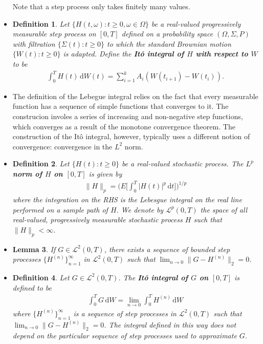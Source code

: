 \documentclass[10pt]{article}
\newtheorem{lemma}{Lemma}
\newtheorem{definition}[lemma]{Definition}
\newcommand{\dee}{\mathrm{d}}
\newcommand{\mcal}[1]{\mathcal{#1}}
\begin{document}
\begin{itemize}
  Note that a step process only takes finitely many values.

  \item \begin{definition}
    Let $\{H(t,\omega): t \geq 0, \omega \in \Omega\}$ be a real-valued progressively measurable step process on $[0,T]$ defined on a probability space $(\Omega,\Sigma,P)$ with filtration $\{ \Sigma(t): t \geq 0 \}$ to which the standard Brownian motion $\{W(t) : t \geq 0\}$ is adapted. Define the {\bf It\^{o} integral of $H$ with respect to $W$} to be
    \begin{align*}
      \int_0^T H(t)\, \dee W(t) = \sum_{i=1}^k A_i ( W(t_{i+1}) - W(t_{i})).
    \end{align*}    
  \end{definition}

  \item The definition of the Lebegue integral relies on the fact that every measurable function has a sequence of simple functions that converges to it. The construcion involes a series of increasing and non-negative step functions, which converges as a result of the monotone convergence theorem. The construction of the It\^{o} integral, however, typically uses a different notion of convergence: convergence in the $L^2$ norm.
  
  \item \begin{definition}
    Let $\{H(t) : t \geq 0\}$ be a real-valued stochastic process. The {\bf $L^p$ norm of $H$ on $[0,T]$} is given by
    \begin{align*}
      \| H \|_p = \bigg( E \bigg[ \int_0^T |H(t)|^p\, \dee t \bigg] \bigg)^{1/p}
    \end{align*}
    where the integration on the RHS is the Lebesgue integral on the real line performed on a sample path of $H$. We denote by $\mcal{L}^p(0,T)$ the space of all real-valued, progressively measurable stochastic process $H$ such that $\| H \|_p < \infty$.    
  \end{definition}

  \item \begin{lemma}
    If $G \in \mcal{L}^2(0,T)$, there exists a sequence of bounded step processes $\{H^{(n)} \}_{n=1}^\infty$ in $\mcal{L}^2(0,T)$ such that
    $\lim_{n \rightarrow 0} \| G - H^{(n)} \|_2 = 0$.    
  \end{lemma}

  \item \begin{definition}
    Let $G \in \mcal{L}^2(0,T)$. The {\bf It\^{o} integral of $G$ on $[0,T]$} is defined to be
    \begin{align*}
      \int_0^T G\, \dee W = \lim_{n \rightarrow 0} \int_0^T H^{(n)}\, \dee W
    \end{align*}
    where $\{H^{(n)} \}_{n=1}^\infty$ is a sequence of step processes in $\mcal{L}^2(0,T)$ such that $\lim_{n \rightarrow 0} \| G - H^{(n)} \|_2 = 0$. The integral defined in this way does not depend on the particular sequence of step processes used to approximate $G$.
  \end{definition}  


\end{itemize}
\end{document}
